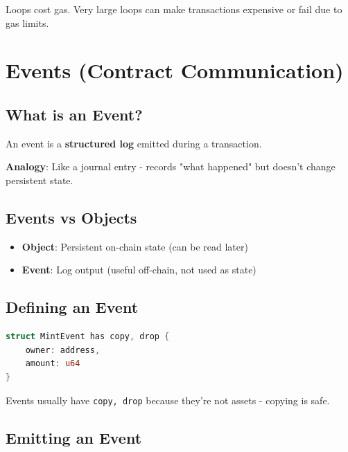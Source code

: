 \documentclass[11pt]{article}
\begin{document}
\begin{warnBox}
Loops cost gas. Very large loops can make transactions expensive or fail due to gas limits.
\end{warnBox}

\section{Events (Contract Communication)}

\subsection{What is an Event?}

An event is a \textbf{structured log} emitted during a transaction.

\begin{noteBox}
\textbf{Analogy}: Like a journal entry - records "what happened" but doesn't change persistent state.
\end{noteBox}

\subsection{Events vs Objects}

\begin{itemize}
  \item \textbf{Object}: Persistent on-chain state (can be read later)
  \item \textbf{Event}: Log output (useful off-chain, not used as state)
\end{itemize}

\subsection{Defining an Event}

\begin{lstlisting}[language=Rust]
struct MintEvent has copy, drop {
    owner: address,
    amount: u64
}
\end{lstlisting}

\begin{noteBox}
Events usually have \texttt{copy, drop} because they're not assets - copying is safe.
\end{noteBox}

\subsection{Emitting an Event}
\end{document}
